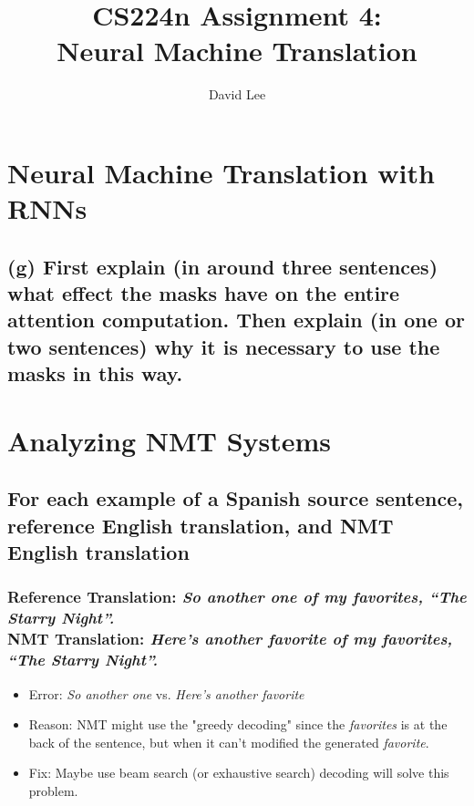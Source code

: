 \documentclass[12pt, letterpaper]{article}
\title{CS224n Assignment 4: \\ Neural Machine Translation}
\author{David Lee}
\begin{document}
\maketitle

\section{Neural Machine Translation with RNNs}
\subsection*{(g) First explain (in around three sentences) what effect the masks have on the entire attention computation. Then explain (in one or two sentences) why it is necessary to use the masks in this way.}

\section{Analyzing NMT Systems}
\subsection{For each example of a Spanish source sentence, reference English translation, and NMT English translation}
\subsubsection{\textbf{Reference Translation}: \textit{So another one of my favorites, “The Starry Night”.} \\ \textbf{NMT Translation}: \textit{Here’s another favorite of my favorites, “The Starry Night”.}}

\begin{itemize}
  \item Error: \textit{So another one} vs. \textit{Here’s another favorite}
  \item Reason: NMT might use the "greedy decoding" since the \textit{favorites} is at the back of the sentence, but when it can't modified the generated \textit{favorite}.
  \item Fix: Maybe use beam search (or exhaustive search) decoding will solve this problem.
\end{itemize}
\end{document}

